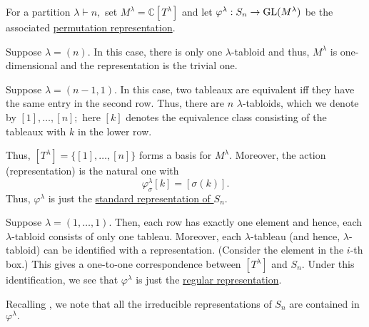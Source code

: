\begin{defn}%
	For a partition $\lambda \vdash n,$ set $M^\lambda = \mathbb{C}[T^\lambda]$ and let $\varphi^\lambda : S_n \to \operatorname{GL}(M^\lambda)$ be the associated \hyperref[defn:permrep]{permutation representation}.
\end{defn}

\begin{ex} \label{ex:trivialtabloidrep}
	Suppose $\lambda = (n).$ In this case, there is only one $\lambda$-tabloid and thus, $M^\lambda$ is one-dimensional and the representation is the trivial one.
\end{ex}

\begin{ex} \label{ex:standardtabloidrep}
	Suppose $\lambda = (n-1, 1).$ In this case, two tableaux are equivalent iff they have the same entry in the second row. Thus, there are $n$ $\lambda$-tabloids, which we denote by $[1], \ldots, [n];$ here $[k]$ denotes the equivalence class consisting of the tableaux with $k$ in the lower row.

	Thus, $[T^\lambda] = \{[1], \ldots, [n]\}$ forms a basis for $M^\lambda.$ Moreover, the action (representation) is the natural one with
	\begin{equation*} 
		\varphi^\lambda_{\sigma} [k] = [\sigma(k)].
	\end{equation*}
	Thus, $\varphi^\lambda$ is just the \hyperref[ex:standardrepSn]{standard representation of $S_n$}.
\end{ex}

\begin{ex} \label{ex:alttabloidrep1}
	Suppose $\lambda = (1, \ldots, 1).$ Then, each row has exactly one element and hence, each $\lambda$-tabloid consists of only one tableau. Moreover, each $\lambda$-tableau (and hence, $\lambda$-tabloid) can be identified with a representation. (Consider the element in the $i$-th box.) This gives a one-to-one correspondence between $[T^\lambda]$ and $S_n.$ Under this identification, we see that $\varphi^\lambda$ is just the \hyperref[defn:regularrepresentation]{regular representation}.

	Recalling , we note that all the irreducible representations of $S_n$ are contained in $\varphi^\lambda.$
\end{ex}


